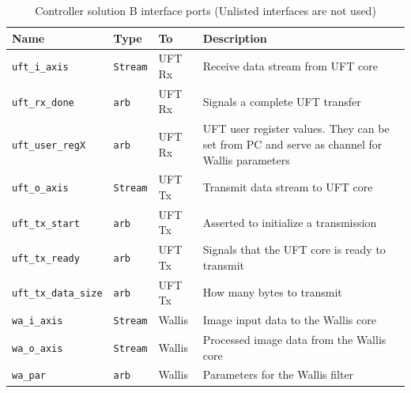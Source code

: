 \begin{table}[t!]
    \centering
    \begin{tabular}{l l l p{8cm}}
        \toprule
        Name & Type & To & Description \\
        \midrule
        \texttt{uft\_i\_axis} & \texttt{Stream} & UFT Rx &
        Receive data stream from UFT core
        \\

        \texttt{uft\_rx\_done} & \texttt{arb} & UFT Rx &
        Signals a complete UFT transfer
        \\  
        \texttt{uft\_user\_regX} & \texttt{arb} & UFT Rx &
        UFT user register values. They can be set from PC and serve as channel
        for Wallis parameters
        \\  
        \midrule
        \texttt{uft\_o\_axis} & \texttt{Stream} & UFT Tx &
        Transmit data stream to UFT core
        \\
        \texttt{uft\_tx\_start} & \texttt{arb} & UFT Tx &
        Asserted to initialize a transmission
        \\
        \texttt{uft\_tx\_ready} & \texttt{arb} & UFT Tx &
        Signals that the UFT core is ready to transmit
        \\
        \texttt{uft\_tx\_data\_size} & \texttt{arb} & UFT Tx &
        How many bytes to transmit
        \\
        \midrule
        \texttt{wa\_i\_axis} & \texttt{Stream} & Wallis &
        Image input data to the Wallis core
        \\
        \texttt{wa\_o\_axis} & \texttt{Stream} & Wallis &
        Processed image data from the Wallis core
        \\
        \texttt{wa\_par} & \texttt{arb} & Wallis &
        Parameters for the Wallis filter
        \\
        \bottomrule
    \end{tabular}
    \caption{Controller solution B interface ports (Unlisted interfaces
    are not used)}
    \label{tab:controllerbports}
\end{table}

